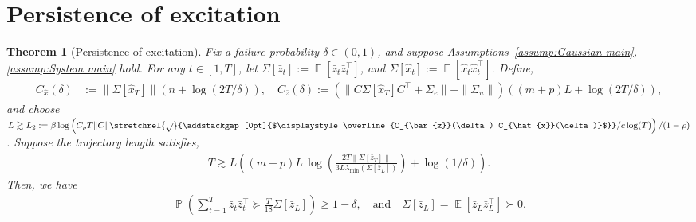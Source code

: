 \documentclass[11pt]{article}
\newtheorem{theorem}{Theorem}
\newcommand{\zbar}{\bar{z}}
\newcommand{\xtil}{\hat{x}}
\newcommand{\tn}[1]{\left\|{#1}\right\|_{\ell_2}}
\newcommand{\E}{\operatorname{\mathbb{E}}}
\renewcommand{\P}{\operatorname{\mathbb{P}}}
\newcommand{\norm}[1]{\|{#1} \|}
\newcommand{\normbig}[1]{\left\|{#1} \right\|}
\newcommand{\T}{\top}
\newcommand{\<}{\langle}
\renewcommand{\>}{\rangle}
\renewcommand{\P}{\operatorname{\mathbb{P}}}
\numberwithin{equation}{section}
\newcommand\mysqrt[2][0pt]{\stretchrel{\sqrt{}}{\addstackgap%
		[#1]{$\displaystyle\overline{#2}$}}}
\begin{document}
\section{Persistence of excitation} %
\begin{theorem}[Persistence of excitation]\label{thrm:persistence_of_excitation}
    Fix a failure probability $\delta \in (0,1)$, and suppose Assumptions~\ref{assump:Gaussian main}, \ref{assump:System main} hold. For any $t \in [1,T]$, let $\Sigma[\zbar_t] := \E[\zbar_t\zbar_t^\T]$, and $\Sigma[\xtil_t] := \E[\xtil_t\xtil_t^\T]$. Define,
\begin{equation}
\begin{aligned} \label{eqn:C_xtil_and_C_zbar}
    C_{\xtil}(\delta) &:= \norm{\Sigma[\xtil_T]} \left(n + \log (2T/\delta)\right),  \quad
    C_{\zbar}(\delta) := (\norm{C\Sigma[\xtil_T]C^\T + \Sigma_e} + \norm{\Sigma_u}) \left( (m+p)L + \log (2T/\delta)\right),
\end{aligned}
\end{equation}
    and choose $L \gtrsim L_2 := \beta\log\left(C_\rho T \norm{C}\mysqrt{C_{\zbar}(\delta) C_{\xtil}(\delta)}/c\log(T)\right)/(1-\rho)$. Suppose the trajectory length satisfies,
    \begin{align*}
        T \gtrsim L \left((m+p)L \,\log\left(\frac{2T\normbig{\Sigma[\zbar_T]}}{3L \lambda_{\min}\left(\Sigma[\zbar_L]\right)}\right)  + \log(1/\delta)\right).
    \end{align*}
    Then, we have
    \begin{align}
        \P \left( \sum_{t=1}^T \zbar_t \zbar_t^\T \succeq \frac{T}{18}\Sigma[\zbar_L]\right) \geq 1- \delta, \quad \text{and} \quad \Sigma[\zbar_L] = \E[\zbar_L \zbar_L^\T] \succ 0.
    \end{align}
\end{theorem}
\end{document}
